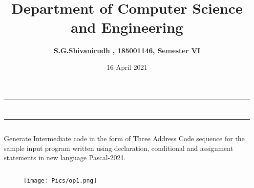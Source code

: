 \documentclass[12pt,letterpaper]{article}
\title{\textbf{Department of Computer Science and Engineering}}
\author{\textbf{S.G.Shivanirudh , 185001146, Semester VI }}
\date{16 April 2021}
\begin{document}
\maketitle
\hrule
\section*{}
\hrule 
\bigskip\bigskip

\subsection*{}

\subsection*{}
\begin{flushleft}
    Generate Intermediate code in the form of Three Address Code sequence for the sample input program written 
    using declaration, conditional and assignment statements in new language Pascal-2021.
\end{flushleft}

\subsection*{}
\subsubsection*{}
\begin{flushleft}

\end{flushleft}
\subsubsection*{}
\begin{flushleft}

\end{flushleft}

\newpage
\subsection*{}
\begin{figure}[h]
    \centering
    \texttt{[image: Pics/op1.png]}
\end{figure}
\end{document}
